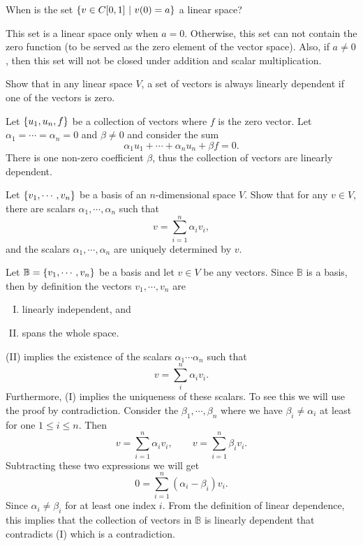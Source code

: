 \begin{problem}
	When is the set $ \{v \in C[0,1]\ |\ v(0) = a\} $ a linear space?
\end{problem}
\begin{solution}
	This set is a linear space only when $ a = 0 $. Otherwise, this set can not contain the zero function (to be served as the zero element of the vector space). Also, if $ a \neq 0 $, then this set will not be closed under addition and scalar multiplication.
\end{solution}

\begin{problem}
	Show that in any linear space $ V $, a set of vectors is always linearly dependent if one of the vectors is zero.
\end{problem}
\begin{solution}
	Let $ \{u_1,u_n,f\} $ be a collection of vectors where $ f $ is the zero vector. Let $ \alpha_1 = \cdots  = \alpha_n =0 $ and $ \beta \neq 0 $ and consider the sum
	\[ \alpha_1u_1 + \cdots + \alpha_n u_n + \beta f  = 0. \]
	There is one non-zero coefficient $ \beta $, thus the collection of vectors are linearly dependent.
\end{solution}

\begin{problem}
	Let $ \{v_1,\cdots,v_n\} $ be a basis of an $ n\text{-dimensional}$ space $ V $. Show that for any $ v\in V $, there are scalars $ \alpha_1,\cdots, \alpha_n $ such that 
	\[ v = \sum_{i=1}^{n} \alpha_i v_i, \]
	and the scalars $ \alpha_1,\cdots,\alpha_n $ are uniquely determined by $ v $.
\end{problem}
\begin{solution}
	Let $ \mathbb{B} = \{v_1,\cdots,v_n\} $ be a basis and let $ v \in V $ be any vectors. Since $ \mathbb{B} $ is a basis, then by definition the vectors $ v_1,\cdots,v_n $ are
	\begin{enumerate}[(I),noitemsep]
		\item linearly independent, and
		\item spans the whole space.
	\end{enumerate}
	(II) implies the existence of the scalars $ \alpha_1\cdots\alpha_n $ such that 
	\[ v = \sum_{i}^{n} \alpha_i v_i. \]
	Furthermore, (I) implies the uniqueness of these scalars. To see this we will use the proof by contradiction. Consider the $ \beta_1, \cdots, \beta_n $ where we have $ \beta_i \neq \alpha_i $ at least for one $ 1\leq i\leq n $. Then 
	\[ v = \sum_{i=1}^{n} \alpha_i v_i, \qquad v = \sum_{i=1}^{n} \beta_i v_i. \]
	Subtracting these two expressions we will get
	\[ 0 = \sum_{i=1}^{n} (\alpha_i - \beta_i) v_i. \]
	Since $ \alpha_i \neq \beta_i $ for at least one index $ i $. From the definition of linear dependence, this implies that the collection of vectors in $ \mathbb{B} $ is linearly dependent that contradicts (I) which is a contradiction.
\end{solution}